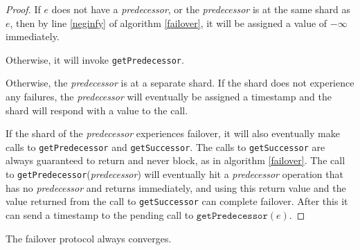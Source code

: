 \begin{proof}
    If $e$ does not have a \textit{predecessor}, or the \textit{predecessor} is at the same shard as $e$, then by line \ref{neginfy} of algorithm \ref{failover}, it will be assigned a value of $-\infty$ immediately.

    Otherwise, it will invoke \texttt{getPredecessor}. 

    Otherwise, the \textit{predecessor} is at a separate shard. If the shard does not experience any failures, the \textit{predecessor} will eventually be assigned a timestamp and the shard will respond with a value to the call. 
    
    If the shard of the \textit{predecessor} experiences failover, it will also eventually make calls to \texttt{getPredecessor} and \texttt{getSuccessor}. The calls to \texttt{getSuccessor} are always guaranteed to return and never block, as in algorithm \ref{failover}. The call to \texttt{getPredecessor}(\textit{predecessor}) will eventually hit a \textit{predecessor} operation that has no \textit{predecessor} and returns immediately, and using this return value and the value returned from the call to \texttt{getSuccessor} can complete failover. After this it can send a timestamp to the pending call to $\texttt{getPredecessor}(e)$.
\end{proof}

\begin{lem}
    The failover protocol always converges.
\end{lem}

